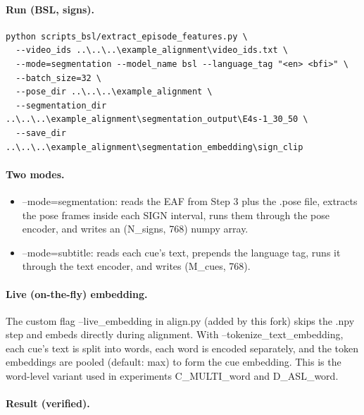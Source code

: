 \documentclass[11pt,a4paper]{article}
\def\texttt#1{#1}%
\def\emph#1{#1}%
\begin{document}
\paragraph{Run (BSL, signs).}
\begin{lstlisting}
python scripts_bsl/extract_episode_features.py \
  --video_ids ..\..\..\example_alignment\video_ids.txt \
  --mode=segmentation --model_name bsl --language_tag "<en> <bfi>" \
  --batch_size=32 \
  --pose_dir ..\..\..\example_alignment \
  --segmentation_dir ..\..\..\example_alignment\segmentation_output\E4s-1_30_50 \
  --save_dir ..\..\..\example_alignment\segmentation_embedding\sign_clip
\end{lstlisting}

\paragraph{Two modes.}
\begin{itemize}[leftmargin=1.5em]
  \item \texttt{--mode=segmentation}: reads the EAF from Step 3 plus the
        \texttt{.pose} file, extracts the pose frames inside each
        \texttt{SIGN} interval, runs them through the pose encoder, and
        writes an \texttt{(N\_signs, 768)} numpy array.
  \item \texttt{--mode=subtitle}: reads each cue's text, prepends the
        language tag, runs it through the text encoder, and writes
        \texttt{(M\_cues, 768)}.
\end{itemize}

\paragraph{Live (on-the-fly) embedding.} The custom flag
\texttt{--live\_embedding} in \texttt{align.py} (added by this fork) skips
the .npy step and embeds directly during alignment. With
\texttt{--tokenize\_text\_embedding}, each cue's text is split into words,
each word is encoded separately, and the token embeddings are pooled
(default: \texttt{max}) to form the cue embedding. This is the
\emph{word-level} variant used in experiments \texttt{C\_MULTI\_word} and
\texttt{D\_ASL\_word}.

\paragraph{Result (verified).}
\end{document}

